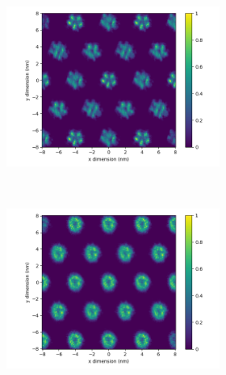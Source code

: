 \documentclass{article}
\begin{document}
\begin{figure}
\begin{subfigure}{1\linewidth}
        \begin{subfigure}{0.45\linewidth}
                \centering
                \includegraphics[width=\linewidth]{disorder_sandwich_xy_rings.png}
                \caption{}~\label{fig:disorder_sandwich_xy}
        \end{subfigure}%
        \begin{subfigure}{0.45\linewidth}
                \centering
                \includegraphics[width=\linewidth]{disorder_offset_xy_rings.png}
                \caption{}~\label{fig:disorder_offset_xy}
        \end{subfigure}
  \end{subfigure}
  \caption{}\label{fig:xy_correlation}
  \end{figure}
\end{document}
